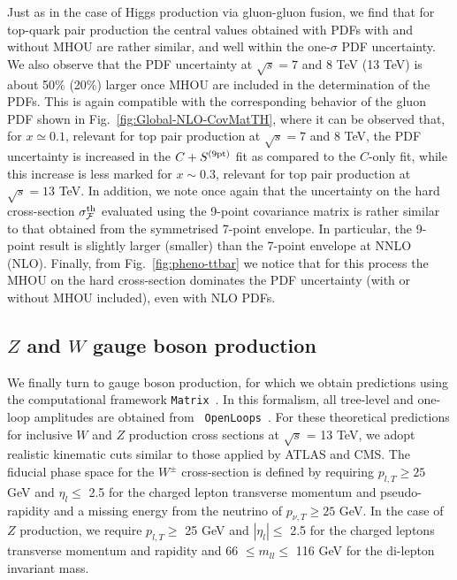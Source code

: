 Just as in the case of Higgs production via gluon-gluon fusion,
we find  that for top-quark pair production the central values obtained with 
PDFs with and without MHOU are rather similar, and well within the one-$\sigma$
PDF uncertainty.
%
We also observe that the PDF uncertainty at $\sqrt{s}=7$ and 8 TeV (13 TeV) 
is about 50\% (20\%) larger once MHOU are included in the determination of the PDFs. 
%
This is again compatible with the  corresponding behavior of the gluon PDF shown in 
Fig.~\ref{fig:Global-NLO-CovMatTH}, where it can be observed that, for $x\simeq 0.1$, 
relevant for top pair production at $\sqrt{s}=7$ and 8 TeV, the PDF uncertainty is increased
in the $C+S^{\rm (9pt)}$ fit as compared to the $C$-only fit, while
this increase is less marked for $x\sim 0.3$, relevant for top pair production at $\sqrt{s}=13$ TeV.
%
In addition, we note once again that the uncertainty on the hard
cross-section
$\sigma_{\mathcal{F}}^{\rm th}$
evaluated using the 9-point covariance matrix is rather
similar to that obtained from the  symmetrised 7-point envelope.
%
 In particular, the 9-point result is slightly larger (smaller) than the 7-point envelope at NNLO (NLO).
Finally, from Fig.~\ref{fig:pheno-ttbar} we notice that for this process
the  MHOU on the hard cross-section  
dominates the PDF uncertainty (with or without MHOU included), 
even with NLO PDFs.


\subsection{$Z$ and $W$ gauge boson production}
\label{sec:zw}
%
We finally turn to gauge boson production, for which we obtain predictions
using  the computational framework {\tt Matrix}~\cite{Grazzini:2017mhc}.
In this formalism, all tree-level and one-loop amplitudes are 
obtained from {\tt
OpenLoops}~\cite{Cascioli:2011va,Matsuura:1988sm,Denner:2016kdg}. 
For these theoretical predictions for  inclusive $W$ and $Z$ production cross sections at
$\sqrt{s}$ = 13 TeV, we adopt realistic kinematic cuts similar to those
applied by ATLAS and CMS.
%
The fiducial phase space for the $W^{\pm}$ cross-section is defined
by requiring $p_{l,T}\ge 25$ GeV and $\eta_{l} \le$ 2.5 for the charged lepton
transverse momentum and pseudo-rapidity and a missing energy
from the neutrino of $p_{\nu,T}\ge 25$ GeV.
%
In the case of $Z$ production, we require 
$p_{l,T}\ge$ 25 GeV and $|\eta_l|\le$ 2.5 for the charged leptons
transverse momentum and rapidity and 66 $\le m_{ll} \le$ 116 GeV for 
the di-lepton invariant mass.

